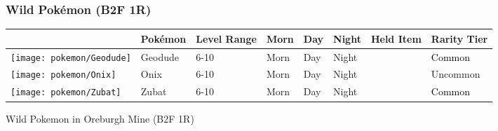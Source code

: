 \subsubsection{Wild Pokémon (B2F 1R)}%
\label{ssubsec:WildPokmon(B2F1R)}%
\begin{longtable}{||l l l l l l l l||}%
\hline%
\rowcolor{gray}%
&Pokémon&Level Range&Morn&Day&Night&Held Item&Rarity Tier\\%
\hline%
\endhead%
\hline%
\rowcolor{gray}%
\texttt{[image: pokemon/Geodude]}&Geodude&6{-}10&Morn&Day&Night&&\textcolor{black}{%
Common%
}\\%
\hline%
\rowcolor{gray}%
\texttt{[image: pokemon/Onix]}&Onix&6{-}10&Morn&Day&Night&&\textcolor{OliveGreen}{%
Uncommon%
}\\%
\hline%
\rowcolor{gray}%
\texttt{[image: pokemon/Zubat]}&Zubat&6{-}10&Morn&Day&Night&&\textcolor{black}{%
Common%
}\\%
\hline%
\end{longtable}%
\caption{Wild Pokemon in Oreburgh Mine (B2F 1R)}